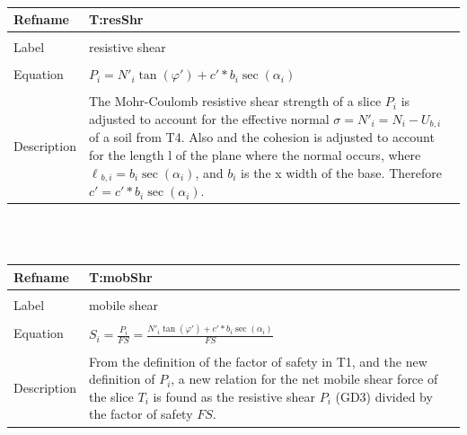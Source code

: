 \documentclass[12pt]{article}
\begin{document}
~\newline
\noindent \begin{minipage}{\textwidth}
\begin{tabular}{p{} p{}}
\toprule \textbf{Refname} & \textbf{T:resShr}
\label{T:resShr}
\\ \midrule \\
Label & resistive shear
\\ \midrule \\
Equation & $P_{i}=N'_{i}\tan(\varphi{}')+c'*b_{i}\sec(\alpha{}_{i})$
\\ \midrule \\
Description & The Mohr-Coulomb resistive shear strength of a slice $P_{i}$ is adjusted to account for the effective normal $\sigma{}=N'_{i}=N_{i}-U_{b,i}$ of a soil from T4. Also and the cohesion is adjusted to account for the length l of the plane where the normal occurs, where $\ell{}_{b,i}=b_{i}\sec(\alpha{}_{i})$, and $b_{i}$ is the x width of the base. Therefore $c'=c'*b_{i}\sec(\alpha{}_{i})$.
\\ \bottomrule \end{tabular}
\end{minipage}\\
~\newline
\noindent \begin{minipage}{\textwidth}
\begin{tabular}{p{} p{}}
\toprule \textbf{Refname} & \textbf{T:mobShr}
\label{T:mobShr}
\\ \midrule \\
Label & mobile shear
\\ \midrule \\
Equation & $S_{i}=\frac{P_{i}}{FS}=\frac{N'_{i}\tan(\varphi{}')+c'*b_{i}\sec(\alpha{}_{i})}{FS}$
\\ \midrule \\
Description & From the definition of the factor of safety in T1, and the new definition of $P_{i}$, a new relation for the net mobile shear force of the slice $T_{i}$ is found as the resistive shear $P_{i}$ (GD3) divided by the factor of safety $FS$.
\\ \bottomrule \end{tabular}
\end{minipage}\\
~\newline
\end{document}
